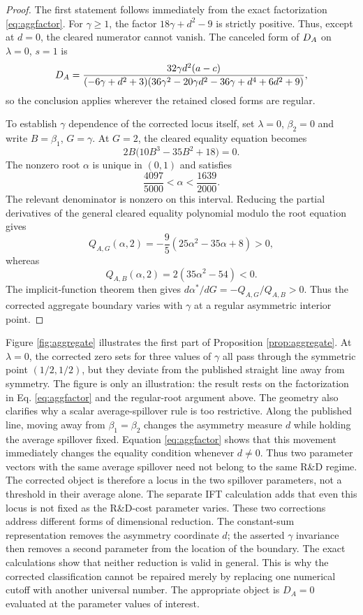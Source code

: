 \begin{proof}
The first statement follows immediately from the exact factorization \eqref{eq:aggfactor}. For $\gamma\geq1$, the factor $18\gamma+d^2-9$ is strictly positive. Thus, except at $d=0$, the cleared numerator cannot vanish. The canceled form of $D_A$ on $\lambda=0$, $s=1$ is
\[
 D_A=
 \frac{32\gamma d^2(a-c)}
 {(-6\gamma+d^2+3)
  (36\gamma^2-20\gamma d^2-36\gamma+d^4+6d^2+9)},
\]
so the conclusion applies wherever the retained closed forms are regular.

To establish $\gamma$ dependence of the corrected locus itself, set $\lambda=0$, $\beta_2=0$ and write $B=\beta_1$, $G=\gamma$. At $G=2$, the cleared equality equation becomes
\begin{equation}\label{eq:alphaeq}
 2B\bigl(10B^3-35B^2+18\bigr)=0.
\end{equation}
The nonzero root $\alpha$ is unique in $(0,1)$ and satisfies
\[
 \frac{4097}{5000}<\alpha<\frac{1639}{2000}.
\]
The relevant denominator is nonzero on this interval. Reducing the partial derivatives of the general cleared equality polynomial modulo the root equation gives
\[
 Q_{A,G}(\alpha,2)
 =-\frac95(25\alpha^2-35\alpha+8)>0,
\]
whereas
\[
 Q_{A,B}(\alpha,2)=2(35\alpha^2-54)<0.
\]
The implicit-function theorem then gives $d\alpha^*/dG=-Q_{A,G}/Q_{A,B}>0$. Thus the corrected aggregate boundary varies with $\gamma$ at a regular asymmetric interior point.\qedhere
\end{proof}

Figure \ref{fig:aggregate} illustrates the first part of Proposition \ref{prop:aggregate}. At $\lambda=0$, the corrected zero sets for three values of $\gamma$ all pass through the symmetric point $(1/2,1/2)$, but they deviate from the published straight line away from symmetry. The figure is only an illustration: the result rests on the factorization in Eq. \eqref{eq:aggfactor} and the regular-root argument above. The geometry also clarifies why a scalar average-spillover rule is too restrictive. Along the published line, moving away from $\beta_1=\beta_2$ changes the asymmetry measure $d$ while holding the average spillover fixed. Equation \eqref{eq:aggfactor} shows that this movement immediately changes the equality condition whenever $d\neq0$. Thus two parameter vectors with the same average spillover need not belong to the same R\&D regime. The corrected object is therefore a locus in the two spillover parameters, not a threshold in their average alone. The separate IFT calculation adds that even this locus is not fixed as the R\&D-cost parameter varies. These two corrections address different forms of dimensional reduction. The constant-sum representation removes the asymmetry coordinate $d$; the asserted $\gamma$ invariance then removes a second parameter from the location of the boundary. The exact calculations show that neither reduction is valid in general. This is why the corrected classification cannot be repaired merely by replacing one numerical cutoff with another universal number. The appropriate object is $D_A=0$ evaluated at the parameter values of interest.

